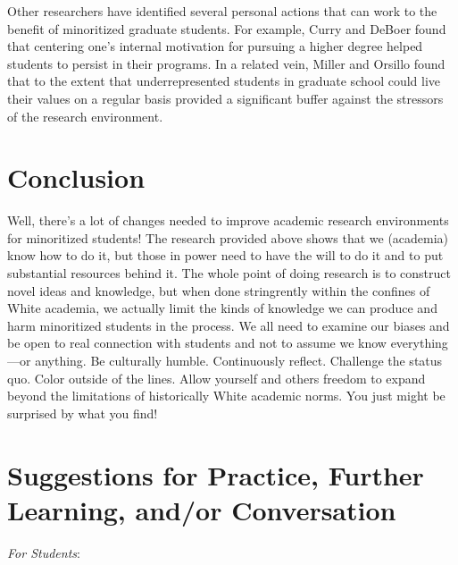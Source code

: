 \documentclass[
  11pt,
]{book}
\begin{document}
Other researchers have identified several personal actions that can work to the benefit of minoritized graduate students. For example, Curry and DeBoer \citeyearpar{curry_systematized_2020} found that centering one's internal motivation for pursuing a higher degree helped students to persist in their programs. In a related vein, Miller and Orsillo \citeyearpar{miller_values_2020} found that to the extent that underrepresented students in graduate school could live their values on a regular basis provided a significant buffer against the stressors of the research environment.

\section{Conclusion}\label{conclusion-1}

Well, there's a lot of changes needed to improve academic research environments for minoritized students! The research provided above shows that we (academia) know how to do it, but those in power need to have the will to do it and to put substantial resources behind it. The whole point of doing research is to construct novel ideas and knowledge, but when done stringrently within the confines of White academia, we actually limit the kinds of knowledge we can produce and harm minoritized students in the process. We all need to examine our biases and be open to real connection with students and not to assume we know everything---or anything. Be culturally humble. Continuously reflect. Challenge the status quo. Color outside of the lines. Allow yourself and others freedom to expand beyond the limitations of historically White academic norms. You just might be surprised by what you find!

\section{Suggestions for Practice, Further Learning, and/or Conversation}\label{suggestions-for-practice-further-learning-andor-conversation-3}

\emph{For Students}:
\end{document}

